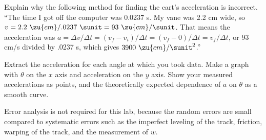 \prelabquestion  Explain why the following method for finding the cart's
acceleration is incorrect.  ``The time I got off the
computer was 0.0237 s.  My vane was 2.2 cm wide, so
$v=2.2\ \zu{cm}/.0237\ \sunit=93\ \zu{cm}/\sunit$.  That means the acceleration
was $a=\Delta v/\Delta t=(v_f-v_i)/\Delta t=(v_f-0)/\Delta t=v_f/\Delta t$, or
93 cm/s divided by .0237 s, which gives $3900\ \zu{cm}/\sunit^2$.''

\analysis

Extract the acceleration for each angle at which you took
data.  Make a graph with $\theta $ on the $x$ axis and
acceleration on the $y$ axis.  Show your measured accelerations
as points, and the theoretically expected dependence of $a$
on $\theta $ as a smooth curve.

Error analysis is not required for this lab, because the
random errors are small compared to systematic errors such
as the imperfect leveling of the track, friction,
warping of the track, and the measurement of $w$.
